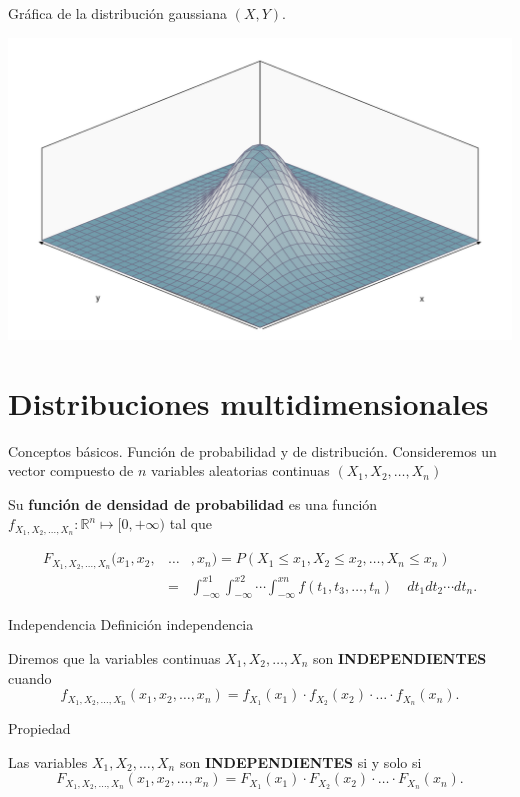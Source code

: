 \documentclass[
  ignorenonframetext,
]{beamer}
\begin{document}
\begin{frame}{Gráfica de la distribución gaussiana \((X,Y)\).}
\protect\hypertarget{gruxe1fica-de-la-distribuciuxf3n-gaussiana-xy.}{}
\begin{center}\includegraphics{Tema_4_VA_Continuas_multidimensionales_files/figure-beamer/unnamed-chunk-2-1} \end{center}
\end{frame}

\hypertarget{distribuciones-multidimensionales}{%
\section{Distribuciones
multidimensionales}\label{distribuciones-multidimensionales}}

\begin{frame}{Conceptos básicos. Función de probabilidad y de
distribución.}
\protect\hypertarget{conceptos-buxe1sicos.-funciuxf3n-de-probabilidad-y-de-distribuciuxf3n.}{}
Consideremos un vector compuesto de \(n\) variables aleatorias continuas
\((X_1,X_2,\ldots,X_n)\)

Su \textbf{función de densidad de probabilidad} es una función
\(f_{X_1,X_2,\ldots, X_n}:\mathbb{R}^n\mapsto [0,+\infty)\) tal que

\[
\begin{eqnarray*}
F_{X_1,X_2,\ldots, X_n}(x_1,x_2,&\ldots&,x_n)=P(X_1\leq x_1,X_2\leq x_2,\ldots, X_n\leq x_n)\\&=&\int_{-\infty}^{x1}\int_{-\infty}^{x2}\cdots \int_{-\infty}^{xn} f(t_1,t_3,\ldots,t_n)\quad dt_1 dt_2\cdots dt_n.
\end{eqnarray*}
\]
\end{frame}

\begin{frame}{Independencia}
\protect\hypertarget{independencia}{}
Definición independencia

Diremos que la variables continuas \(X_1,X_2,\ldots, X_n\) son
\textbf{INDEPENDIENTES} cuando
\[f_{X_1,X_2,\ldots, X_n}(x_1,x_2,\ldots,x_n) =f_{X_1}(x_1)\cdot f_{X_2}(x_2)\cdot  \ldots \cdot  f_{X_n}(x_n).\]

Propiedad

Las variables \(X_1,X_2,\ldots, X_n\) son \textbf{INDEPENDIENTES} si y
solo si
\[F_{X_1,X_2,\ldots, X_n}(x_1,x_2,\ldots,x_n)=F_{X_1}(x_1)\cdot F_{X_2}(x_2)\cdot  \ldots \cdot  F_{X_n}(x_n).\]
\end{frame}
\end{document}
